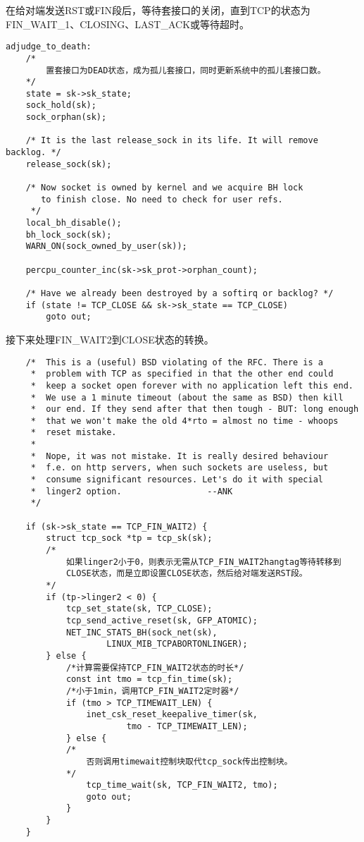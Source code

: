 	在给对端发送RST或FIN段后，等待套接口的关闭，直到TCP的状态为FIN\_WAIT\_1、CLOSING、LAST\_ACK或等待超时。
\begin{verbatim}
adjudge_to_death:
	/*
		置套接口为DEAD状态，成为孤儿套接口，同时更新系统中的孤儿套接口数。
	*/
    state = sk->sk_state;
    sock_hold(sk);
    sock_orphan(sk);

    /* It is the last release_sock in its life. It will remove backlog. */
    release_sock(sk);

    /* Now socket is owned by kernel and we acquire BH lock
       to finish close. No need to check for user refs.
     */
    local_bh_disable();
    bh_lock_sock(sk);
    WARN_ON(sock_owned_by_user(sk));

    percpu_counter_inc(sk->sk_prot->orphan_count);

    /* Have we already been destroyed by a softirq or backlog? */
    if (state != TCP_CLOSE && sk->sk_state == TCP_CLOSE)
        goto out;
\end{verbatim}

	接下来处理FIN\_WAIT2到CLOSE状态的转换。
\begin{verbatim}
    /*  This is a (useful) BSD violating of the RFC. There is a
     *  problem with TCP as specified in that the other end could
     *  keep a socket open forever with no application left this end.
     *  We use a 1 minute timeout (about the same as BSD) then kill
     *  our end. If they send after that then tough - BUT: long enough
     *  that we won't make the old 4*rto = almost no time - whoops
     *  reset mistake.
     *
     *  Nope, it was not mistake. It is really desired behaviour
     *  f.e. on http servers, when such sockets are useless, but
     *  consume significant resources. Let's do it with special
     *  linger2 option.                 --ANK
     */

    if (sk->sk_state == TCP_FIN_WAIT2) {
        struct tcp_sock *tp = tcp_sk(sk);
		/*
			如果linger2小于0，则表示无需从TCP_FIN_WAIT2hangtag等待转移到
			CLOSE状态，而是立即设置CLOSE状态，然后给对端发送RST段。
		*/
        if (tp->linger2 < 0) {
            tcp_set_state(sk, TCP_CLOSE);
            tcp_send_active_reset(sk, GFP_ATOMIC);
            NET_INC_STATS_BH(sock_net(sk),
                    LINUX_MIB_TCPABORTONLINGER);
        } else {
			/*计算需要保持TCP_FIN_WAIT2状态的时长*/
            const int tmo = tcp_fin_time(sk);
			/*小于1min，调用TCP_FIN_WAIT2定时器*/
            if (tmo > TCP_TIMEWAIT_LEN) {
                inet_csk_reset_keepalive_timer(sk,
                        tmo - TCP_TIMEWAIT_LEN);
            } else {
			/*
				否则调用timewait控制块取代tcp_sock传出控制块。
			*/
                tcp_time_wait(sk, TCP_FIN_WAIT2, tmo);
                goto out;
            }
        }
    }
\end{verbatim}

